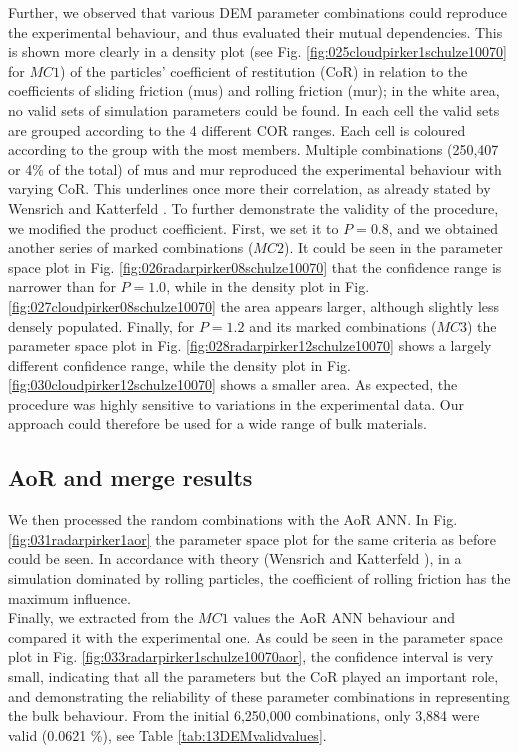 Further, we observed that various \acs{DEM} parameter
combinations could reproduce the experimental behaviour, and thus evaluated
their mutual dependencies.
This is shown more clearly in a density plot (see Fig. 
\ref{fig:025cloudpirker1schulze10070} for $MC1$) 
of the particles' coefficient of restitution (\acs{CoR}) in relation to
the coefficients of sliding friction (\acs{mus}) and rolling friction (\acs{mur}); 
in the white area, no valid sets of simulation parameters could be found.
In each cell the valid sets are grouped according to the 4 different COR
ranges.
Each cell is coloured according to the group with the most members.
Multiple
combinations (250,407 or 4\% of the total) of \acs{mus} and \acs{mur} reproduced
the experimental behaviour with varying \acs{CoR}.
This underlines once more their correlation, as already stated by Wensrich and 
Katterfeld \cite{RefWorks:87}.
To further demonstrate the validity of the procedure, we modified the product
coefficient. 
First, we set it to $P=0.8$, and we obtained another
series of marked combinations ($MC2$).
It could be seen in the parameter space plot in Fig.
\ref{fig:026radarpirker08schulze10070} that the confidence range is narrower
than for $P=1.0$, while in the density plot in Fig. 
\ref{fig:027cloudpirker08schulze10070} the area
appears larger, although slightly less densely populated. Finally, for $P=1.2$
and its marked combinations ($MC3$) the parameter space plot in Fig.
\ref{fig:028radarpirker12schulze10070} shows a largely different confidence
range, while the density plot in Fig. \ref{fig:030cloudpirker12schulze10070} 
shows a smaller area. As expected, the procedure was highly sensitive to
variations in the experimental data.
Our approach could therefore be used
for a wide range of bulk materials.\\

\subsection{AoR and merge results}
\label{subsec:aorandmergeresults}

We then processed the random combinations with the \acs{AoR} \acs{ANN}. In Fig.
\ref{fig:031radarpirker1aor} the parameter space plot for the same criteria as
before could be seen.
In accordance with theory (Wensrich and Katterfeld \cite{RefWorks:87}), in a simulation dominated
by rolling particles, the coefficient of rolling friction has the maximum
influence. \\
Finally, we extracted from the $MC1$ values the \acs{AoR} \acs{ANN} behaviour
and compared it with the experimental one.
As could be seen in the parameter space plot in Fig.
\ref{fig:033radarpirker1schulze10070aor}, the confidence interval is very small,
indicating that all the parameters but the \acs{CoR} played an important role, 
and demonstrating the reliability of these parameter
combinations in representing the bulk behaviour.
From the initial 6,250,000 combinations, only 3,884 were valid (0.0621
\%), see Table \ref{tab:13DEMvalidvalues}.








